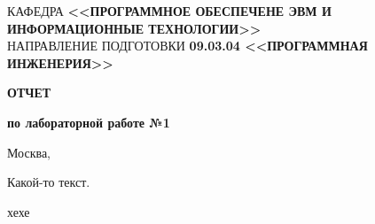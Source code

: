 \documentclass[a4paper, 12pt]{report}
\begin{document}
	\noindent
	\small КАФЕДРА {\bf<<ПРОГРАММНОЕ ОБЕСПЕЧЕНЕ ЭВМ И ИНФОРМАЦИОННЫЕ ТЕХНОЛОГИИ>>}\\
	
	\noindent
	\small НАПРАВЛЕНИЕ ПОДГОТОВКИ {\bf 09.03.04 <<ПРОГРАММНАЯ ИНЖЕНЕРИЯ>>}\\
	
	\vspace{3cm}
	
	\noindent
	\begin{minipage}{\linewidth}
		\centering\large\bf{ОТЧЕТ}
		
		\centering\bf{по лабораторной работе №1}
	\end{minipage}

	\begin{center}		
		\vfill
		
		Москва, \the\year
	\end{center}
	
	\pagebreak
	
	\tableofcontents
	
	\pagebreak
	
	Какой-то текст.
	
	хехе
\end{document}
